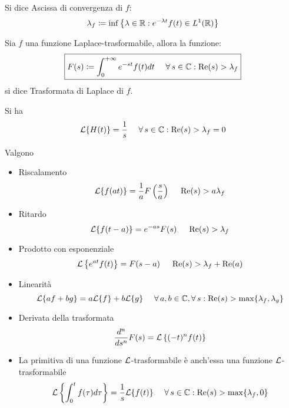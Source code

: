 \begin{defn}
Si dice Ascissa di convergenza di $\displaystyle f$:
\begin{equation*}
\lambda _{f} \coloneqq \inf\left\{\lambda \in \mathbb{R}  :e^{-\lambda t} f( t) \in L^{1}(\mathbb{R} )\right\}
\end{equation*}
\end{defn}
\begin{defn}
Sia $\displaystyle f$ una funzione Laplace-trasformabile, allora la funzione:
\begin{equation*}
\boxed{F( s) \coloneqq \int ^{+\infty }_{0} e^{-st} f( t) dt\ \ \ \ \forall s\in \CC  :\Re ( s)  >\lambda _{f}}
\end{equation*}
si dice Trasformata di Laplace di $\displaystyle f$.
\end{defn}
\begin{rem}
 Si ha
\begin{equation*}
\Lc\{H( t)\} =\frac{1}{s} \ \ \ \ \forall s\in \CC  :\Re ( s)  >\lambda _{f} =0
\end{equation*}
\end{rem}
\begin{thm}
[Proprietà] Valgono
\begin{itemize}
\item Riscalamento\begin{equation*}
\mathcal{L}\{f( at)\} =\frac{1}{a} F\left(\frac{s}{a}\right) \ \ \ \ \operatorname{Re} ( s)  >a\lambda _{f}
\end{equation*}
\item Ritardo\begin{equation*}
\mathcal{L}\{f( t-a)\} =e^{-as} F( s) \ \ \ \ \operatorname{Re} ( s)  >\lambda _{f}
\end{equation*}
\item Prodotto con esponenziale\begin{equation*}
\Lc\left\{e^{at} f( t)\right\} =F( s-a) \ \ \ \ \Re ( s)  >\lambda _{f} +\Re ( a)
\end{equation*}
\item Linearità\begin{equation*}
\Lc\{af+bg\} =a\Lc\{f\} +b\Lc\{g\} \ \ \ \ \forall a,b\in \CC  ,\forall s:\Re ( s)  >\max\{\lambda _{f} ,\lambda _{g}\}
\end{equation*}
\item Derivata della trasformata\begin{equation*}
\frac{d^{n}}{ds^{n}} F( s) =\mathcal{L}\left\{( -t)^{n} f( t)\right\}
\end{equation*}
\item La primitiva di una funzione $\mathcal{L}$-trasformabile è anch'essa una funzione $\mathcal{L}$-trasformabile\begin{equation*}
\Lc\left\{\int ^{t}_{0} f( \tau ) d\tau \right\} =\frac{1}{s}\Lc\{f( t)\} \ \ \ \ \forall s\in \CC  :\Re ( s)  >\max\{\lambda _{f} ,0\}
\end{equation*}
\end{itemize}
\end{thm}
